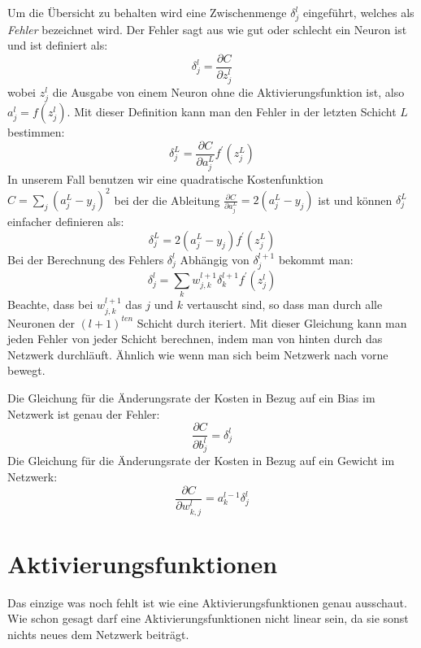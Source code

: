 \documentclass[12pt,a4paper]{report}
\begin{document}
Um die Übersicht zu behalten wird eine Zwischenmenge $\delta^l_j$ eingeführt, welches als \textit{Fehler} bezeichnet wird.
Der Fehler sagt aus wie gut oder schlecht ein Neuron ist und ist definiert als:
\[\delta^l_j = \frac{\partial C}{\partial z^l_j}\]
wobei $z^l_j$ die Ausgabe von einem Neuron ohne die Aktivierungsfunktion ist, also $a^l_j = f(z^l_j)$.
Mit dieser Definition kann man den Fehler in der letzten Schicht $L$ bestimmen:
\[\delta^L_j = \frac{\partial C}{\partial a^L_j}f^\prime(z^L_j)\]
In unserem Fall benutzen wir eine quadratische Kostenfunktion $C = \sum_{j}(a^L_j - y_j)^2$ bei
der die Ableitung $\frac{\partial C}{\partial a^L_j} = 2(a^L_j - y_j)$ ist und können $\delta^L_j$ einfacher definieren als:
\[\delta^L_j = 2(a^L_j - y_j)f^\prime(z^L_j)\]
Bei der Berechnung des Fehlers $\delta^l_j$ Abhängig von $\delta^{l+1}_j$ bekommt man:
\[\delta^l_j = \sum_k w^{l+1}_{j,k}\delta^{l+1}_k f^\prime(z^l_j)\]
Beachte, dass bei $w^{l+1}_{j,k}$ das $j$ und $k$ vertauscht sind, so dass man durch alle Neuronen der $(l+1)^{ten}$ Schicht durch iteriert.
Mit dieser Gleichung kann man jeden Fehler von jeder Schicht berechnen, indem man von hinten durch das Netzwerk durchläuft.
Ähnlich wie wenn man sich beim Netzwerk nach vorne bewegt.

Die Gleichung für die Änderungsrate der Kosten in Bezug auf ein Bias im Netzwerk ist genau der Fehler:
\[\frac{\partial C}{\partial b^l_j} = \delta^l_j\]
Die Gleichung für die Änderungsrate der Kosten in Bezug auf ein Gewicht im Netzwerk:
\[\frac{\partial C}{\partial w^{l}_{k,j}} = a^{l-1}_k\delta^l_j\]

\section{Aktivierungsfunktionen}\label{sec:aktivierungsfunktionen}
Das einzige was noch fehlt ist wie eine Aktivierungsfunktionen genau ausschaut.
Wie schon gesagt darf eine Aktivierungsfunktionen nicht linear sein, da sie sonst nichts neues dem Netzwerk beiträgt.
\end{document}
